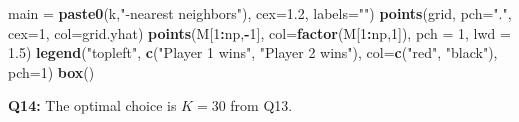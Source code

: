 \documentclass[]{article}
\newenvironment{Shaded}{\begin{snugshade}}{\end{snugshade}}
\newcommand{\KeywordTok}[1]{\textcolor[rgb]{0.13,0.29,0.53}{\textbf{#1}}}
\newcommand{\DataTypeTok}[1]{\textcolor[rgb]{0.13,0.29,0.53}{#1}}
\newcommand{\DecValTok}[1]{\textcolor[rgb]{0.00,0.00,0.81}{#1}}
\newcommand{\FloatTok}[1]{\textcolor[rgb]{0.00,0.00,0.81}{#1}}
\newcommand{\StringTok}[1]{\textcolor[rgb]{0.31,0.60,0.02}{#1}}
\newcommand{\OperatorTok}[1]{\textcolor[rgb]{0.81,0.36,0.00}{\textbf{#1}}}
\newcommand{\NormalTok}[1]{#1}
\begin{document}
\begin{Shaded}
\begin{Highlighting}[]
        \DataTypeTok{main =} \KeywordTok{paste0}\NormalTok{(k,}\StringTok{"-nearest neighbors"}\NormalTok{), }\DataTypeTok{cex=}\FloatTok{1.2}\NormalTok{, }\DataTypeTok{labels=}\StringTok{""}\NormalTok{)}
\KeywordTok{points}\NormalTok{(grid, }\DataTypeTok{pch=}\StringTok{"."}\NormalTok{, }\DataTypeTok{cex=}\DecValTok{1}\NormalTok{, }\DataTypeTok{col=}\NormalTok{grid.yhat)}
\KeywordTok{points}\NormalTok{(M[}\DecValTok{1}\OperatorTok{:}\NormalTok{np,}\OperatorTok{-}\DecValTok{1}\NormalTok{], }\DataTypeTok{col=}\KeywordTok{factor}\NormalTok{(M[}\DecValTok{1}\OperatorTok{:}\NormalTok{np,}\DecValTok{1}\NormalTok{]), }\DataTypeTok{pch =} \DecValTok{1}\NormalTok{, }\DataTypeTok{lwd =} \FloatTok{1.5}\NormalTok{)}
\KeywordTok{legend}\NormalTok{(}\StringTok{"topleft"}\NormalTok{, }\KeywordTok{c}\NormalTok{(}\StringTok{"Player 1 wins"}\NormalTok{, }\StringTok{"Player 2 wins"}\NormalTok{), }
       \DataTypeTok{col=}\KeywordTok{c}\NormalTok{(}\StringTok{"red"}\NormalTok{, }\StringTok{"black"}\NormalTok{), }\DataTypeTok{pch=}\DecValTok{1}\NormalTok{)}
\KeywordTok{box}\NormalTok{()}
\end{Highlighting}
\end{Shaded}

\textbf{Q14:} The optimal choice is \(K = 30\) from Q13.
\end{document}
